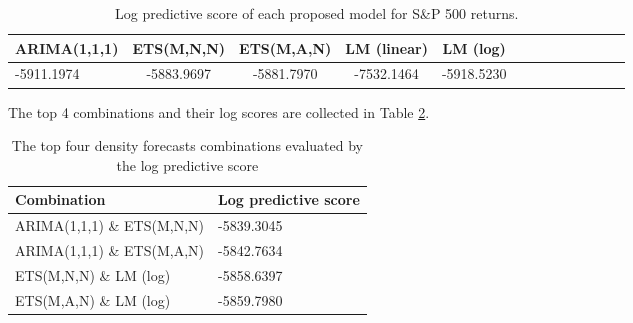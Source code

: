 \documentclass{monashthesis}
\begin{document}
\vspace{0.3cm}

\begin{table}[htbp!]
\centering
\caption{Log predictive score of each proposed model for S\&P 500 returns.}
\begin{tabular}{l*{4}{c}cccccccc}
\hline
     ARIMA(1,1,1) & ETS(M,N,N) & ETS(M,A,N) & LM (linear) & LM (log) \\
    \hline
     -5911.1974 & -5883.9697  & -5881.7970 & -7532.1464 & -5918.5230\\
    \hline
\end{tabular}
\label{tab:1}
\end{table}

The top 4 combinations and their log scores are collected in Table \ref{tab:3}.

\begin{table}[ht]
  \centering
  \caption{The top four density forecasts combinations evaluated by the log predictive score}
    \begin{tabular}{ll}
    \toprule
    Combination & Log predictive score \\
    \midrule
    ARIMA(1,1,1) \& ETS(M,N,N) & -5839.3045 \\
    ARIMA(1,1,1) \& ETS(M,A,N) & -5842.7634 \\
    ETS(M,N,N) \&  LM (log) & -5858.6397 \\
    ETS(M,A,N) \&  LM (log) & -5859.7980 \\
    \bottomrule
    \end{tabular}
  \label{tab:3}
\end{table}

\printbibliography[title={Reference}]
\end{document}
